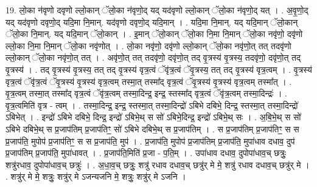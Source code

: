 \documentclass[17pt]{extarticle}
\begin{document}
19. लो॒का न॑वृणो दवृणो ल्लो॒कान् ॅलो॒का न॑वृणो॒द् यद् यद॑वृणो ल्लो॒कान् ॅलो॒का न॑वृणो॒द् यत् । . अ॒वृ॒णो॒द् यद् यद॑वृणो दवृणो॒द् यदि॒मा नि॒मान्. यद॑वृणो दवृणो॒द् यदि॒मान् । . यदि॒मा नि॒मान्. यद् यदि॒मान् ॅलो॒कान् ॅलो॒का नि॒मान्. यद् यदि॒मान् ॅलो॒कान् । . इ॒मान् ॅलो॒कान् ॅलो॒का नि॒मा नि॒मान् ॅलो॒का नवृ॑णो॒ दवृ॑णो ल्लो॒का नि॒मा नि॒मान् ॅलो॒का नवृ॑णोत् । . लो॒का नवृ॑णो॒ दवृ॑णो ल्लो॒कान् ॅलो॒का नवृ॑णो॒त् तत् तदवृ॑णो ल्लो॒कान् ॅलो॒का नवृ॑णो॒त् तत् । . अवृ॑णो॒त् तत् तदवृ॑णो॒ दवृ॑णो॒त् तद् वृ॒त्रस्य॑ वृ॒त्रस्य॒ तदवृ॑णो॒ दवृ॑णो॒त् तद् वृ॒त्रस्य॑ । . तद् वृ॒त्रस्य॑ वृ॒त्रस्य॒ तत् तद् वृ॒त्रस्य॑ वृत्र॒त्वं ॅवृ॑त्र॒त्वं ॅवृ॒त्रस्य॒ तत् तद् वृ॒त्रस्य॑ वृत्र॒त्वम् । . वृ॒त्रस्य॑ वृत्र॒त्वं ॅवृ॑त्र॒त्वं ॅवृ॒त्रस्य॑ वृ॒त्रस्य॑ वृत्र॒त्वम् तस्मा॒त् तस्मा᳚द् वृत्र॒त्वं ॅवृ॒त्रस्य॑ वृ॒त्रस्य॑ वृत्र॒त्वम् तस्मा᳚त् । . वृ॒त्र॒त्वम् तस्मा॒त् तस्मा᳚द् वृत्र॒त्वं ॅवृ॑त्र॒त्वम् तस्मा॒दिन्द्र॒ इन्द्र॒ स्तस्मा᳚द् वृत्र॒त्वं ॅवृ॑त्र॒त्वम् तस्मा॒दिन्द्रः॑ । . वृ॒त्र॒त्वमिति॑ वृत्र - त्वम् । . तस्मा॒दिन्द्र॒ इन्द्र॒ स्तस्मा॒त् तस्मा॒दिन्द्रो॑ ऽबिभे दबिभे॒ दिन्द्र॒ स्तस्मा॒त् तस्मा॒दिन्द्रो॑ ऽबिभेत् । . इन्द्रो॑ ऽबिभे दबिभे॒ दिन्द्र॒ इन्द्रो॑ ऽबिभे॒थ् स सो॑ ऽबिभे॒दिन्द्र॒ इन्द्रो॑ ऽबिभे॒थ् सः । . अ॒बि॒भे॒थ् स सो॑ ऽबिभे दबिभे॒थ् स प्र॒जाप॑तिम् प्र॒जाप॑तिꣳ॒॒ सो॑ ऽबिभे दबिभे॒थ् स प्र॒जाप॑तिम् । . स प्र॒जाप॑तिम् प्र॒जाप॑तिꣳ॒॒ स स प्र॒जाप॑ति॒ मुपोप॑ प्र॒जाप॑तिꣳ॒॒ स स प्र॒जाप॑ति॒ मुप॑ । . प्र॒जाप॑ति॒ मुपोप॑ प्र॒जाप॑तिम् प्र॒जाप॑ति॒ मुपा॑धाव दधाव॒ दुप॑ प्र॒जाप॑तिम् प्र॒जाप॑ति॒ मुपा॑धावत् । . प्र॒जाप॑ति॒मिति॑ प्र॒जा - प॒ति॒म् । . उपा॑धाव दधाव॒ दुपोपा॑धाव॒च् छत्रुः॒ शत्रु॑रधाव॒ दुपोपा॑धाव॒च् छत्रुः॑ । . अ॒धा॒व॒च् छत्रुः॒ शत्रु॑ रधाव दधाव॒च् छत्रु॑र् मे मे॒ शत्रु॑ रधाव दधाव॒च् छत्रु॑र् मे । . शत्रु॑र् मे मे॒ शत्रुः॒ शत्रु॑र् मे ऽजन्यजनि मे॒ शत्रुः॒ शत्रु॑र् मे ऽजनि । \newline
\end{document}
